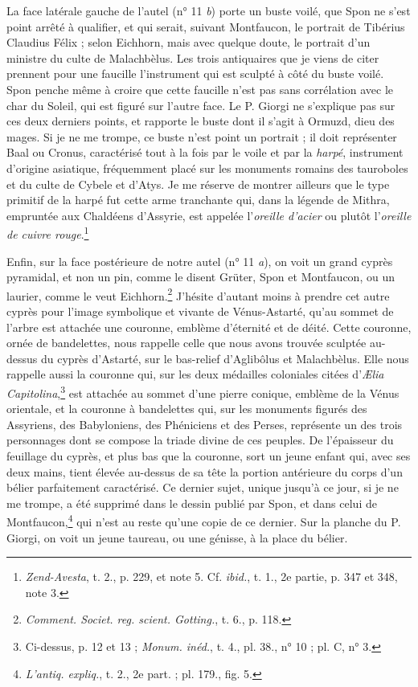 \documentclass[a4paper, 11pt, oneside, polutonikogreek, french]{article}
\begin{document}
La face latérale gauche de l'autel (n° 11 \emph{b}) porte un buste voilé, que Spon ne s'est point arrêté à qualifier, et qui serait, suivant Montfaucon, le portrait de Tibérius Claudius Félix ; selon Eichhorn, mais avec quelque doute, le portrait d'un ministre du culte de Malachbèlus. Les trois antiquaires que je viens de citer prennent pour une faucille l'instrument qui est sculpté à côté du buste voilé. Spon penche même à croire que cette faucille n'est pas sans corrélation avec le char du Soleil, qui est figuré sur l'autre face. Le P. Giorgi ne s'explique pas sur ces deux derniers points, et rapporte le buste dont il s'agit à Ormuzd, dieu des mages. Si je ne me trompe, ce buste n'est point un portrait ; il doit représenter Baal ou Cronus, caractérisé tout à la fois par le voile et par la \emph{harpé}, instrument d'origine asiatique, fréquemment placé sur les monuments romains des tauroboles et du culte de Cybele et d'Atys. Je me réserve de montrer ailleurs que le type primitif de la harpé fut cette arme tranchante qui, dans la légende de Mithra, empruntée aux Chaldéens d'Assyrie, est appelée l'\emph{oreille d'acier} ou plutôt l'\emph{oreille de cuivre rouge}.\footnote{\emph{Zend-Avesta}, t. 2., p. 229, et note 5. Cf. \emph{ibid.}, t. 1., 2e partie, p. 347 et 348, note 3.}

Enfin, sur la face postérieure de notre autel (n° 11 \emph{a}), on voit un grand cyprès pyramidal, et non un pin, comme le disent Grüter, Spon et Montfaucon, ou un laurier, comme le veut Eichhorn.\footnote{\emph{Comment. Societ. reg. scient. Gotting.}, t. 6., p. 118.} J'hésite d'autant moins à prendre cet autre cyprès pour l'image symbolique et vivante de Vénus-Astarté, qu'au sommet de l'arbre est attachée une couronne, emblème d'éternité et de déité. Cette couronne, ornée de bandelettes, nous rappelle celle que nous avons trouvée sculptée au-dessus du cyprès d'Astarté, sur le bas-relief d'Aglibôlus et Malachbèlus. Elle nous rappelle aussi la couronne qui, sur les deux médailles coloniales citées d'\emph{Ælia Capitolina},\footnote{Ci-dessus, p. 12 et 13 ; \emph{Monum. inéd.}, t. 4., pl. 38., n° 10 ; pl. C, n° 3.} est attachée au sommet d'une pierre conique, emblème de la Vénus orientale, et la couronne à bandelettes qui, sur les monuments figurés des Assyriens, des Babyloniens, des Phéniciens et des Perses, représente un des trois personnages dont se compose la triade divine de ces peuples. De l'épaisseur du feuillage du cyprès, et plus bas que la couronne, sort un jeune enfant qui, avec ses deux mains, tient élevée au-dessus de sa tête la portion antérieure du corps d'un bélier parfaitement caractérisé. Ce dernier sujet, unique jusqu'à ce jour, si je ne me trompe, a été supprimé dans le dessin publié par Spon, et dans celui de Montfaucon,\footnote{\emph{L'antiq. expliq.}, t. 2., 2e part. ; pl. 179., fig. 5.} qui n'est au reste qu'une copie de ce dernier. Sur la planche du P. Giorgi, on voit un jeune taureau, ou une génisse, à la place du bélier.
\end{document}
